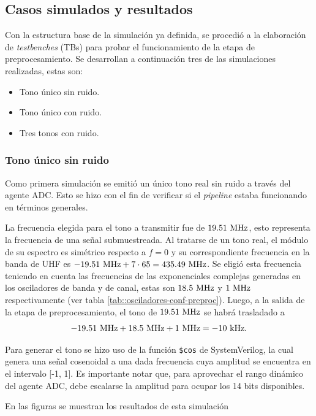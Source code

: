 \documentclass[../../main.tex]{subfiles}
\begin{document}
\subsection{Casos simulados y resultados}
Con la estructura base de la simulación ya definida, se procedió a la elaboración de \textit{testbenches} (TBs) para probar el funcionamiento de la etapa de preprocesamiento. Se desarrollan a continuación tres de las simulaciones realizadas, estas son:
\begin{itemize}
    \item Tono único sin ruido.
    \item Tono único con ruido.
    \item Tres tonos con ruido.
\end{itemize}

\subsubsection{Tono único sin ruido}

Como primera simulación se emitió un único tono real sin ruido a través del agente ADC. Esto se hizo con el fin de verificar si el \textit{pipeline} estaba funcionando en términos generales.

La frecuencia elegida para el tono a transmitir fue de $19.51~\textrm{MHz}$, esto representa la frecuencia de una señal submuestreada. Al tratarse de un tono real, el módulo de su espectro es simétrico respecto a $f = 0$ y su correspondiente frecuencia en la banda de UHF es $- 19.51~\textrm{MHz} + 7 \cdot 65 = 435.49~\textrm{MHz}$. Se eligió esta frecuencia teniendo en cuenta las frecuencias de las exponenciales complejas generadas en los osciladores de banda y de canal, estas son $18.5~\textrm{MHz}$ y $1~\textrm{MHz}$ respectivamente (ver tabla \ref{tab::osciladores-conf-preproc}). Luego, a la salida de la etapa de preprocesamiento, el tono de $19.51~\textrm{MHz}$ se habrá trasladado a 
\[ - 19.51~\textrm{MHz} + 18.5~\textrm{MHz} + 1~\textrm{MHz} = -10~\textrm{kHz}.\]

Para generar el tono se hizo uso de la función \texttt{\$cos} de SystemVerilog, la cual genera una señal cosenoidal a una dada frecuencia cuya amplitud se encuentra en el intervalo [-1, 1]. Es importante notar que, para aprovechar el rango dinámico del agente ADC, debe escalarse la amplitud para ocupar los 14 bits disponibles.

En las figuras  se muestran los resultados de esta simulación

\end{document}
